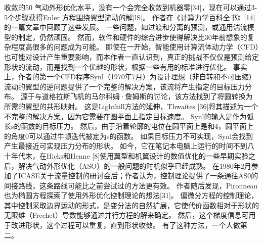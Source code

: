 \documentclass[UTF8,11pt,a4paper,openany,fontset=fandol]{ctexbook}
\begin{document}
收敛的50 气动外形优化水平，没有一个会完全收敛到机器零[34]，现在可以通过3-5个步骤获得Euler 方程围绕翼型流动的解[lS]。 作者在《计算力学百科全书》[14]的一篇文章中回顾了这些发展。 一些问题，如过渡和分离的预测，或通用湍流模型的制定，仍然顽固。 然而，软件和硬件的综合进步使得解决比30年前想象的复杂程度高很多的问题成为可能。 即使在一开始，智能使用计算流体动力学（CFD）也可能对设计产生重要影响，而本作者一直认识到，真正的挑战不仅仅是预测给定形状的流动，而是找到一个优越的形状，根据一些有用的标准进行优化。 事实上，作者的第一个CFD程序Synl（1970年7月）为设计理想（非自转和不可压缩）流动的翼型的逆问题提供了一个完整的解决方案，该流将产生指定的目标压力分布。 源于与道格拉斯飞机的马尔科姆·詹姆斯的讨论，该方法找到了将圆转换为所需的翼型的共形映射。 这是Lighthill方法的延伸，Thwaites [36]将其描述为一个不完整的解决方案，因为它需要在圆平面上指定目标速度。 Synl的输入是作为弧长s的函数的目标压力。 然后，由于沿着轮廓的电位在圆平面上是和4，圆平面上的角度0可以通过牛顿迭代被定为s的函数。 如果目标压力不可实现，Synl会找到产生最接近可实现压力分布的形状。 如今，它在笔记本电脑上运行的时间不到八十年代末，在Hicks和Henne [8]使用翼型和机翼设计的数值优化的一些早期实验之后，解决气动外形优化（ASO）的一般问题的时机似乎已经成熟。 在1980年2月参加了ICASE关于流量控制的研讨会后；作者认为，控制理论提供了一条通往AS0的间接路线，这条路线可能比之前尝试过的方法更有效。 作者随后发现，Pironneau也为椭圆方程探索了使用外形优化控制理论的想法[31]。 偏微分方程的控制理论，其中控制采取边界运动的形式，是变分法的自然扩展，它使代价函数相对于形状的无限维（Frechet）导数能够通过并行方程的解来确定。 然后，这个梯度信息可用于改进形状，这个过程可以重复，直到形状收敛。 有了这种方法，一个人做第二。
\end{document}

